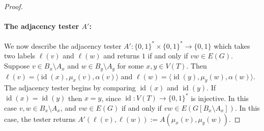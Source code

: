 \documentclass{patmorin}
\DeclareMathOperator{\id}{id}
\begin{document}
\begin{proof}
  \paragraph{\boldmath The adjacency tester $A'$:} We now describe the adjacency tester $A':\{0,1\}^*\times\{0,1\}^*\to\{0,1\}$ which takes two labels $\ell(v)$ and $\ell(w)$ and returns $1$ if and only if $vw\in E(G)$.  Suppose $v\in B_x\setminus A_x$ and $w\in B_y\setminus A_y$ for some $x,y\in V(T)$.  Then $\ell(v)=\langle \id(x), \mu_x(v), \alpha(v)\rangle$ and $\ell(w)=\langle \id(y), \mu_y(w), \alpha(w)\rangle$.  The adjacency tester begins by comparing $\id(x)$ and $\id(y)$.  If $\id(x)=\id(y)$ then $x=y$, since $\id:V(T)\to\{0,1\}^*$ is injective.  In this case $v,w\in B_x\setminus A_x$,  and $vw\in E(G)$ if and only if $vw\in E(G[B_x\setminus A_x])$.  In this case, the tester returns $A'(\ell(v),\ell(w)):=A(\mu_x(v),\mu_y(w))$.  
  

\end{proof}
\end{document}
